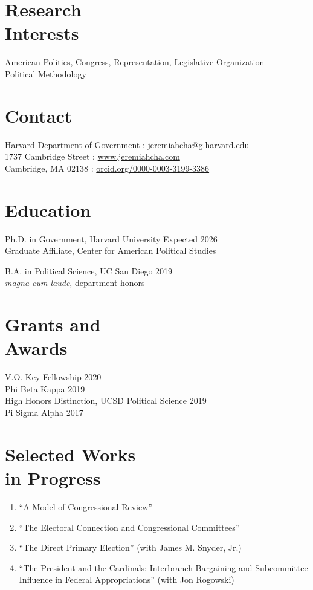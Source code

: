 \documentclass[margin, line]{res}
\begin{document}
\begin{resume}

\section{Research\\Interests}
American Politics, Congress, Representation, Legislative Organization\\
Political Methodology

\section{Contact}
Harvard Department of Government \hfill \Letter: \href{mailto:jeremiahcha@g.harvard.edu}{jeremiahcha@g.harvard.edu}\\
1737 Cambridge Street \hfill \Mundus: \href{httsp://www.jeremiahcha.com}{www.jeremiahcha.com}\\
Cambridge, MA 02138 \hfill \Mundus: \href{https://orcid.org/0000-0003-3199-3386}{orcid.org/0000-0003-3199-3386}

\section{Education}
Ph.D. in Government, Harvard University \hfill Expected 2026\\
\hspace*{5mm}Graduate Affiliate, Center for American Political Studies

B.A. in Political Science, UC San Diego \hfill 2019\\
\hspace*{5mm}\textit{magna cum laude}, department honors

\section{Grants and \\Awards}
V.O. Key Fellowship \hfill 2020 - \\
Phi Beta Kappa \hfill 2019\\
High Honors Distinction, UCSD Political Science \hfill 2019\\
Pi Sigma Alpha \hfill 2017


\section{Selected Works \\in Progress}
\begin{enumerate}
	\item ``A Model of Congressional Review''
	\item ``The Electoral Connection and Congressional Committees''
	\item ``The Direct Primary Election'' (with James M. Snyder, Jr.)
	\item ``The President and the Cardinals: Interbranch Bargaining and Subcommittee Influence in Federal Appropriations'' (with Jon Rogowski)
\end{enumerate}


\end{resume}
\end{document}
